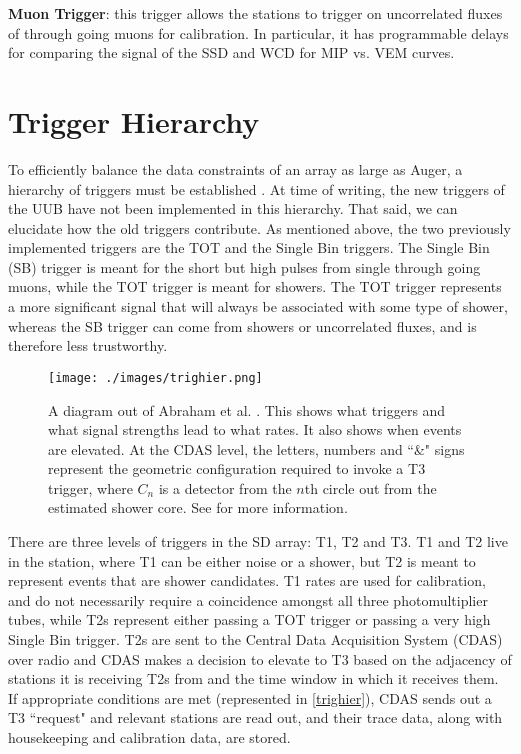 \noindent\textbf{Muon Trigger}: this trigger allows the stations to trigger on uncorrelated fluxes of through going muons for calibration. In particular, it has programmable delays for comparing the signal of the SSD and WCD for MIP vs. VEM curves. 

\section{Trigger Hierarchy}
\label{triggerarchy}
To efficiently balance the data constraints of an array as large as Auger, a hierarchy of triggers must be established \cite{ubtriggers}. At time of writing, the new triggers of the UUB have not been implemented in this hierarchy. That said, we can elucidate how the old triggers contribute. As mentioned above, the two previously implemented triggers are the TOT and the Single Bin triggers. The Single Bin (SB) trigger is meant for the short but high pulses from single through going muons, while the TOT trigger is meant for showers. The TOT trigger represents a more significant signal that will always be associated with some type of shower, whereas the SB trigger can come from showers or uncorrelated fluxes, and is therefore less trustworthy.

\begin{figure}[h!]
\begin{center}
\texttt{[image: ./images/trighier.png]}
\caption[Auger Trigger Hierarchy]{A diagram out of Abraham et al. \cite{ubtriggers}. This shows what triggers and what signal strengths lead to what rates. It also shows when events are elevated. At the CDAS level, the letters, numbers and ``\&" signs represent the geometric configuration required to invoke a T3 trigger, where $C_n$ is a detector from the $n$th circle out from the estimated shower core. See \cite{ubtriggers} for more information.}
\label{trighier}
\end{center}
\end{figure}

There are three levels of triggers in the SD array: T1, T2 and T3. T1 and T2 live in the station, where T1 can be either noise or a shower, but T2 is meant to represent events that are shower candidates. T1 rates are used for calibration, and do not necessarily require a coincidence amongst all three photomultiplier tubes, while T2s represent either passing a TOT trigger or passing a very high Single Bin trigger. T2s are sent to the Central Data Acquisition System (CDAS) over radio and CDAS makes a decision to elevate to T3 based on the adjacency of stations it is receiving T2s from and the time window in which it receives them. If appropriate conditions are met (represented in \autoref{trighier}), CDAS sends out a T3 ``request" and relevant stations are read out, and their trace data, along with housekeeping and calibration data, are stored.